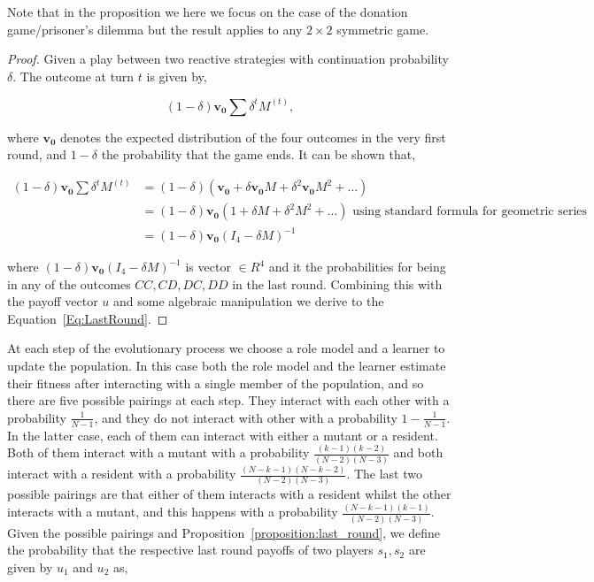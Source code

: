 \documentclass[11pt]{article}
\theoremstyle{plainCl1}
\theoremstyle{plainCl2}
\begin{document}
Note that in the proposition we here we focus on the case of the donation game/prisoner's
dilemma but the result applies to any \(2 \times 2\) symmetric game.

\begin{proof}
Given a play between two reactive strategies with continuation probability
$\delta$. The outcome at turn \(t\) is given by,

\begin{equation}\label{eq:}
  (1 - \delta) \mathbf{v_0} \sum \delta^{t} M^{(t)},
\end{equation}

where $\mathbf{v_0}$ denotes the expected distribution of the four outcomes in
the very first round, and \(1- \delta\) the probability that the game ends. It
can be shown that,

\begin{align*}
  (1 - \delta) \mathbf{v_0} \sum \delta^{t} M^{(t)} & = (1 - \delta)(\mathbf{v_0} + \delta \mathbf{v_0} M + \delta^{2}\mathbf{v_0} M ^{2} + \dots )\\ 
   & = (1 - \delta)\mathbf{v_0} (1 + \delta M + \delta^{2}M ^{2} + \dots ) \text{ using standard formula for geometric series}\\ 
   & = (1 - \delta)\mathbf{v_0}(I_4 - \delta M)^{-1}
\end{align*}

where \((1 - \delta)\mathbf{v_0}(I_4 - \delta M)^{-1}\) is vector \(\in R^{4}\)
and it the probabilities for being in any of the outcomes \(CC, CD, DC, DD\) in
the last round. Combining this with the payoff vector \(u\) and some algebraic
manipulation we derive to the Equation~\ref{Eq:LastRound}.
\end{proof}

At each step of the evolutionary process we choose a role model and a learner to
update the population. In this case both the role model and the learner estimate
their fitness after interacting with a single member of the population, and so
there are five possible pairings at each step. They interact with each other with a
probability \(\frac{1}{N - 1}\), and they do not interact with other with a
probability \(1 - \frac{1}{N - 1}\). In the latter case, each of them can
interact with either a mutant or a resident. Both of them interact with a mutant
with a probability $\frac{(k-1)(k-2)}{(N-2)(N-3)}$ and both interact with a
resident with a probability $\frac{(N-k-1)(N-k-2)}{(N-2)(N-3)}$. The last two
possible pairings are that either of them interacts with a resident whilst the
other interacts with a mutant, and this happens with a probability
$\frac{(N-k-1)(k-1)}{(N-2)(N-3)}$. Given the possible pairings and
Proposition~\ref{proposition:last_round}, we define the probability that the
respective last round payoffs of two players \(s_1, s_2\) are given by $u_1$ and
$u_2$ as,
\end{document}
